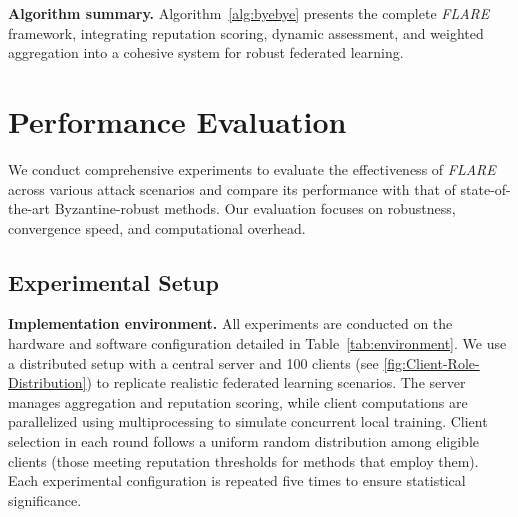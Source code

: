 \documentclass[lettersize,journal]{IEEEtran}
\begin{document}
{\textbf{Algorithm summary.} Algorithm~\ref{alg:byebye} presents the complete \textit{FLARE} framework, integrating reputation scoring, dynamic assessment, and weighted aggregation into a cohesive system for robust federated learning.





\section{Performance Evaluation} \label{sec:performance}

We conduct comprehensive experiments to evaluate the effectiveness of \textit{FLARE} across various attack scenarios and compare its performance with that of state-of-the-art Byzantine-robust methods. Our evaluation focuses on robustness, convergence speed, and computational overhead.

\subsection{Experimental Setup}

\textbf{Implementation environment.} All experiments are conducted on the hardware and software configuration detailed in Table~\ref{tab:environment}. We use a distributed setup with a central server and 100 clients (see \cref{fig:Client-Role-Distribution}) to replicate realistic federated learning scenarios. The server manages aggregation and reputation scoring, while client computations are parallelized using multiprocessing to simulate concurrent local training. Client selection in each round follows a uniform random distribution among eligible clients (those meeting reputation thresholds for methods that employ them). Each experimental configuration is repeated five times to ensure statistical significance.




\begin{table}
\centering
\setlength{\extrarowheight}{0pt}
\setlength{\aboverulesep}{0pt}
\setlength{\belowrulesep}{0pt}
\caption{Experimental Environment Configuration}
\label{tab:environment}


\end{table}}
\end{document}
